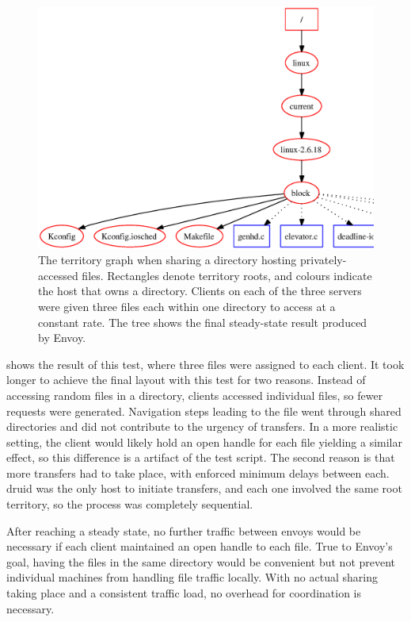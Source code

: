 \begin{figure}[t]
\centering
\includegraphics[width=\figwidth]{figures/territory-logs}
\caption[Territory graph for log files in a shared directory]{The territory graph when sharing a directory hosting privately-accessed files. Rectangles denote territory roots, and colours indicate the host that owns a directory. Clients on each of the three servers were given three files each within one directory to access at a constant rate. The tree shows the final steady-state result produced by Envoy.}
\label{fig:territory-logs}
\end{figure}

 shows the result of this test, where three files were assigned to each client. It took longer to achieve the final layout with this test for two reasons. Instead of accessing random files in a directory, clients accessed individual files, so fewer requests were generated. Navigation steps leading to the file went through shared directories and did not contribute to the urgency of transfers. In a more realistic setting, the client would likely hold an open handle for each file yielding a similar effect, so this difference is a artifact of the test script. The second reason is that more transfers had to take place, with enforced minimum delays between each. druid was the only host to initiate transfers, and each one involved the same root territory, so the process was completely sequential.

After reaching a steady state, no further traffic between envoys would be necessary if each client maintained an open handle to each file. True to Envoy's goal, having the files in the same directory would be convenient but not prevent individual machines from handling file traffic locally. With no actual sharing taking place and a consistent traffic load, no overhead for coordination is necessary.

